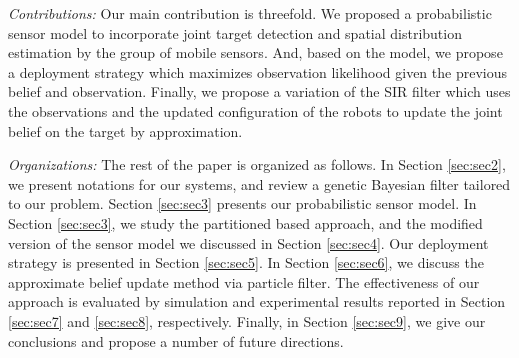 \documentclass[journal]{IEEEtran}
\begin{document}
%
%
%
%
%

\textit{Contributions:}
Our main contribution is threefold.
We proposed a probabilistic sensor model to incorporate joint target detection and spatial distribution estimation by the group of mobile sensors.
And, based on the model, we propose a deployment strategy which maximizes observation likelihood given the previous belief and observation.  
Finally, we propose a variation of the SIR filter 
which uses the observations and the updated configuration of the robots to update the joint belief on the target by approximation.


\textit{Organizations:}
The rest of the paper is organized as follows. 
In Section \ref{sec:sec2}, we present notations for our systems, and review a genetic Bayesian filter tailored to our problem.
Section \ref{sec:sec3} presents our probabilistic sensor model.
In Section \ref{sec:sec3}, we study the partitioned based approach, and the modified version of the sensor model we discussed in Section \ref{sec:sec4}. Our deployment strategy is presented in Section \ref{sec:sec5}. In Section \ref{sec:sec6}, we discuss the approximate belief update method via particle filter.
The effectiveness of our approach is evaluated by simulation and experimental results reported in Section \ref{sec:sec7} and \ref{sec:sec8}, respectively.
Finally, in Section \ref{sec:sec9}, we give our conclusions and propose a number of future directions.
\end{document}
